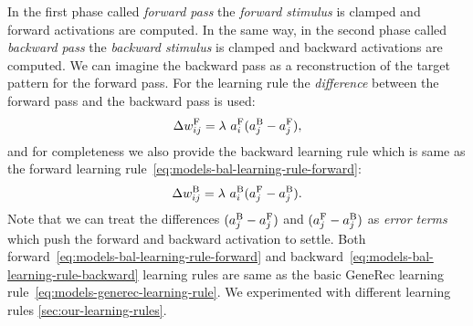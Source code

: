 In the first phase called \emph{forward pass} the \emph{forward stimulus} is clamped and forward activations are computed. In the same way, in the second phase called \emph{backward pass} the \emph{backward stimulus} is clamped and backward activations are computed. We can imagine the backward pass as a reconstruction of the target pattern for the forward pass. For the learning rule the \emph{difference} between the forward pass and the backward pass is used: 
\begin{equation}
  \label{eq:models-bal-learning-rule-forward}
  \Delta w_{ij}^{\rm F} = \lambda \ a_i^{\rm F}(a_j^{\rm B} - a_j^{\rm F}),
\end{equation}
and for completeness we also provide the backward learning rule which is same as the forward learning rule~\ref{eq:models-bal-learning-rule-forward}: 
\begin{equation}
  \label{eq:models-bal-learning-rule-backward}
  \Delta w_{ij}^{\rm B} = \lambda \ a_i^{\rm B}(a_j^{\rm F} - a_j^{\rm B}). 
\end{equation}
Note that we can treat the differences $(a_j^{\rm B} - a_j^{\rm F})$ and $(a_j^{\rm F} - a_j^{\rm B})$ as \emph{error terms} which push the forward and backward activation to settle. Both forward~\ref{eq:models-bal-learning-rule-forward} and backward~\ref{eq:models-bal-learning-rule-backward} learning rules are same as the basic GeneRec learning rule~\ref{eq:models-generec-learning-rule}. We experimented with different learning rules \ref{sec:our-learning-rules}. 

 



